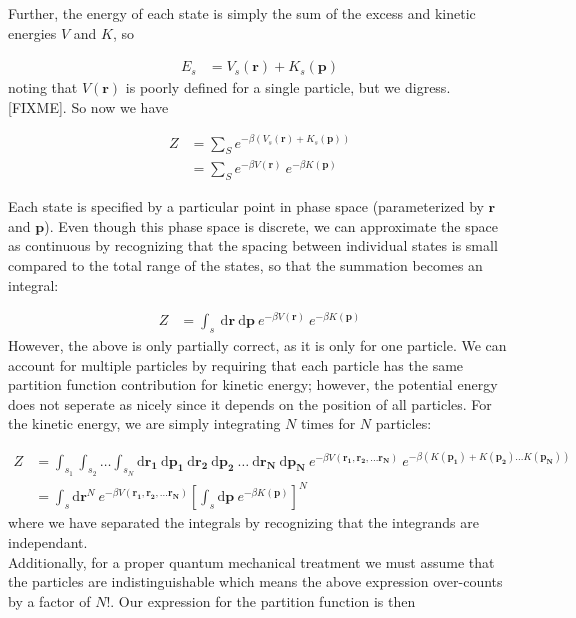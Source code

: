 \documentclass[12pt]{article}
\newcommand*{\diff}{\mathrm{d}}
\begin{document}
Further, the energy of each state is simply the sum of the excess and kinetic energies $V$ and $K$, so

\begin{align}
    E_s &= V_s(\mathbf{r}) + K_s(\mathbf{p})
\end{align}
noting that $V(\mathbf{r})$ is poorly defined for a single particle, but we digress. [FIXME]. 
So now we have 

\begin{align}
    Z &= \sum_S e^{-\beta (V_s(\mathbf{r}) + K_s(\mathbf{p}))}\\
    &= \sum_S e^{-\beta V(\mathbf{r})}~e^{-\beta K(\mathbf{p})}
\end{align} 

Each state is specified by a particular point in phase space (parameterized by $\mathbf{r}$ and $\mathbf{p}$). Even though this phase space is discrete, we can approximate the space as continuous by recognizing that the {\color{red}spacing between individual states is small compared to the total range of the states}, so that the summation becomes an integral:

\begin{align}
    Z &= \int_s~ \diff\mathbf{r}~ \diff\mathbf{p} ~e^{-\beta V(\mathbf{r})}~e^{-\beta K(\mathbf{p})}
\end{align} 
However, the above is only partially correct, as it is only for one particle. We can account for multiple particles by requiring that each particle has the same partition function contribution for kinetic energy; however, the potential energy does not seperate as nicely since it depends on the position of all particles. For the kinetic energy, we are simply integrating $N$ times for $N$ particles:

\begin{align}
    Z &= \int_{s_1} \int_{s_2} \dots \int_{s_N} \diff\mathbf{r_1}~ \diff\mathbf{p_1} ~\diff\mathbf{r_2} ~\diff\mathbf{p_2} ~\dots ~\diff\mathbf{r_N}~ \diff\mathbf{p_N} ~e^{-\beta V(\mathbf{r_1}, \mathbf{r_2}, \dots \mathbf{r_N})}~e^{-\beta(K(\mathbf{p_1}) + K(\mathbf{p_2}) ... K(\mathbf{p_N}))}\\
    &= \int_s \diff\mathbf{r}^N ~e^{-\beta V(\mathbf{r_1}, \mathbf{r_2}, \dots \mathbf{r_N})} \left[\int_s \diff\mathbf{p}~e^{-\beta K(\mathbf{p})}\right]^{N}
\end{align}
where we have separated the integrals by recognizing that the integrands are independant.\\
Additionally, for a proper quantum mechanical treatment we must assume that the particles are indistinguishable which means the above expression over-counts by a factor of $N!$. Our expression for the partition function is then
\end{document}
